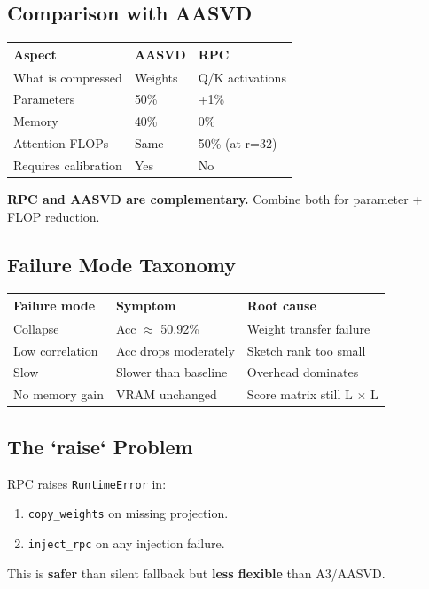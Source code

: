 \subsection{Comparison with AASVD}

\begin{table}[H]
\centering
\small
\begin{tabular}{lll}
\toprule
\textbf{Aspect} & \textbf{AASVD} & \textbf{RPC} \\
\midrule
What is compressed & Weights & Q/K activations \\
Parameters & 50\% & +1\% \\
Memory & 40\% & 0\% \\
Attention FLOPs & Same & 50\% (at r=32) \\
Requires calibration & Yes & No \\
\bottomrule
\end{tabular}
\end{table}

\textbf{RPC and AASVD are complementary.} Combine both for parameter + FLOP 
reduction.

\subsection{Failure Mode Taxonomy}

\begin{table}[H]
\centering
\small
\begin{tabular}{lll}
\toprule
\textbf{Failure mode} & \textbf{Symptom} & \textbf{Root cause} \\
\midrule
Collapse & Acc $\approx$ 50.92\% & Weight transfer failure \\
Low correlation & Acc drops moderately & Sketch rank too small \\
Slow & Slower than baseline & Overhead dominates \\
No memory gain & VRAM unchanged & Score matrix still L $\times$ L \\
\bottomrule
\end{tabular}
\end{table}

\subsection{The `raise` Problem}

RPC raises \texttt{RuntimeError} in:
\begin{enumerate}
\item \texttt{copy\_weights} on missing projection.
\item \texttt{inject\_rpc} on any injection failure.

\end{enumerate}
This is \textbf{safer} than silent fallback but \textbf{less flexible} than A3/AASVD.


